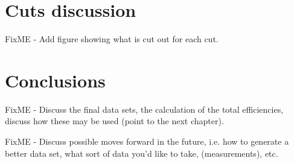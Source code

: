 	\section{Cuts discussion}
	\label{sec:BeGeCutsDiscussion}

FixME - Add figure showing what is cut out for each cut.

	\section{Conclusions}
     	\label{sec:CutConclusions}		
	

FixME - Discuss the final data sets, the calculation of the total efficiencies, discuss how these may be used (point to the next chapter).  
  
FixME - Discuss possible moves forward in the future, i.e. how to generate a better data set, what sort of data you'd like to take, (measurements), etc.  			


